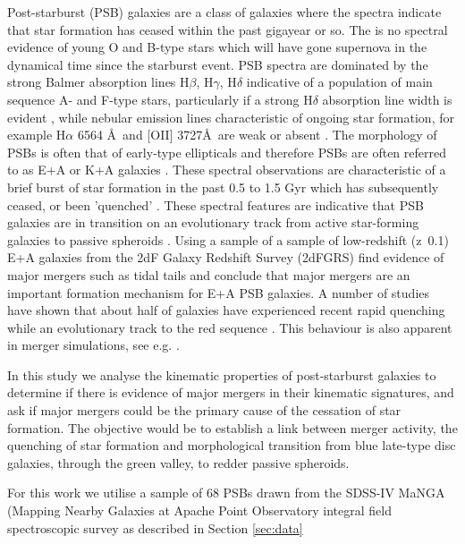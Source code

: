 Post-starburst (PSB) galaxies are a class of galaxies where the spectra indicate that star formation has ceased within the past gigayear or so. The is no spectral evidence of young O and B-type stars which will have gone supernova in the dynamical time since the starburst event. PSB spectra are dominated by the strong Balmer absorption lines H$\beta$, H$\gamma$, H$\delta$ indicative of a population of main sequence A- and F-type stars, particularly if a strong  H$\delta$ absorption line width is evident \citep{1997A&A...325.1025P}, while nebular emission lines characteristic of ongoing star formation, for example H$\alpha$ 6564 \AA\ and [OII] 3727\AA\, are weak or absent \citep{2001ApJ...547L..17B,2003PASJ...55..771G,2004MNRAS.355..713B,2005MNRAS.357..937G,2018MNRAS.477.1708P}. The morphology of PSBs is often that of early-type ellipticals and therefore PSBs are often referred to as E+A or K+A galaxies \citep{1983ApJ...270....7D,1996ApJ...466..104Z,2009ARA&A..47..159B}. These spectral observations are characteristic of a brief burst of star formation in the past 0.5 to 1.5 Gyr which has subsequently ceased, or been 'quenched' \citep{1983ApJ...270....7D,1987MNRAS.229..423C,1997A&A...325.1025P}. These spectral features are indicative that PSB galaxies are in transition on an evolutionary track from active star-forming galaxies to passive spheroids \citep{2004MNRAS.355..713B,2012MNRAS.420..672S,2013MNRAS.429.2212M}. Using a sample of a sample of low-redshift (z~0.1) E+A galaxies from the 2dF Galaxy Redshift Survey (2dFGRS) \citet{2004MNRAS.355..713B} find evidence of major mergers such as tidal tails and conclude that major mergers are an important formation mechanism for E+A PSB galaxies. A number of studies have shown that about half of galaxies have experienced recent rapid quenching while an evolutionary track to the red sequence \citep{Martin_2007,10.1111/j.1365-2966.2009.14537.x,2015MNRAS.450..435S}. This behaviour is also apparent in merger simulations, see e.g. \cite{2019MNRAS.484.2447D}.

In this study we analyse the kinematic properties of post-starburst galaxies to determine if there is evidence of major mergers in their kinematic signatures, and ask if major mergers could be the primary cause of the cessation of star formation. The objective would be to establish a link between merger activity, the quenching of star formation and morphological transition from blue late-type disc galaxies, through the green valley, to redder passive spheroids.

For this work we utilise a sample of 68 PSBs drawn from the SDSS-IV MaNGA (Mapping Nearby Galaxies at Apache Point Observatory integral field spectroscopic survey  as described in Section \ref{sec:data}

